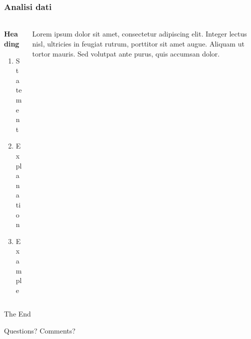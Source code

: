 \documentclass[
	11pt, %
]{beamer}
\begin{document}
\begin{frame}
	\frametitle{Analisi dati}
	\framesubtitle{} %
	
	\begin{columns}[c] %
		\begin{column}{0.45\textwidth} %
			\textbf{Heading}
			\begin{enumerate}
				\item Statement
				\item Explanation
				\item Example
			\end{enumerate}
		\end{column}
		\begin{column}{0.5\textwidth} %
			Lorem ipsum dolor sit amet, consectetur adipiscing elit. Integer lectus nisl, ultricies in feugiat rutrum, porttitor sit amet augue. Aliquam ut tortor mauris. Sed volutpat ante purus, quis accumsan dolor.
		\end{column}
	\end{columns}
\end{frame}



\begin{frame}[plain] %
	\begin{center}
		{\Huge The End}
		
		\bigskip\bigskip %
		
		{\LARGE Questions? Comments?}
	\end{center}
\end{frame}

\end{document}
